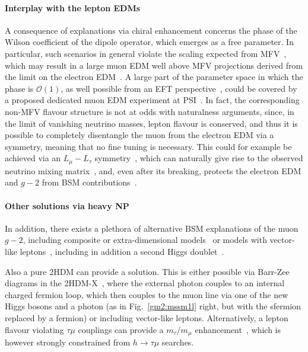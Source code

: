 \documentclass[10pt]{article}
\begin{document}
\paragraph{Interplay with the lepton EDMs}
%
A consequence of explanations via chiral enhancement concerns the phase of the Wilson coefficient of the dipole operator, which emerges as a free parameter. In particular, such scenarios in general violate
the scaling expected from MFV~\cite{Giudice:2012ms,Crivellin:2018qmi},
which may result in a large muon EDM well above MFV projections
derived from the limit on the electron EDM~\cite{Andreev:2018ayy}. A large part of the parameter space in which the phase is ${\mathcal O}(1)$, as well possible from an EFT
perspective~\cite{Pruna:2017tif,Crivellin:2018qmi,Crivellin:2019mvj}, could be covered by a proposed dedicated muon EDM experiment at
PSI~\cite{Adelmann:2021udj}.  In fact, the corresponding non-MFV flavour structure is not at odds with naturalness arguments, since, in the limit of vanishing neutrino masses, lepton flavour is conserved, and thus it is possible to completely disentangle the muon from the electron EDM via a symmetry, meaning that no fine tuning is
necessary. This could for example be achieved via an $L_\mu-L_\tau$ symmetry~\cite{He:1990pn,Foot:1990mn,He:1991qd}, which can naturally give rise to the observed neutrino mixing
matrix~\cite{Binetruy:1996cs,Bell:2000vh,Choubey:2004hn}, and, even after its breaking, protects the electron EDM and $g-2$ from BSM contributions~\cite{Altmannshofer:2016oaq}.

\paragraph{Other solutions via heavy NP}
%
In addition, there exists a plethora of alternative BSM explanations
of the muon $g-2$, including composite or extra-dimensional
models~\cite{Das:2001it,Xiong:2001rt,Park:2001uc} or models with vector-like leptons~\cite{Stockinger:1900zz,Giudice:2012ms,Dermisek:2013gta,Falkowski:2013jya,Altmannshofer:2016oaq,Kowalska:2017iqv,Crivellin:2018qmi,Arnan:2019uhr,Crivellin:2021rbq}, including in addition a second Higgs doublet~\cite{Ferreira:2021gke,Chun:2020uzw,Frank:2020smf}.

Also a pure 2HDM can provide a solution. This is either possible via Barr-Zee diagrams in the 2HDM-X~\cite{Cao:2009as,Broggio:2014mna,Wang:2014sda,Ilisie:2015tra,Abe:2015oca,Crivellin:2015hha,Chun:2015hsa,Chun:2016hzs,Cherchiglia:2017uwv,Wang:2018hnw,Chun:2019oix,Chun:2019sjo,Athron:2021iuf,Ferreira:2021gke}, where the external photon
couples to an internal charged fermion loop, which then couples to the muon line via one of the new Higgs bosons and a photon (as in Fig.~\ref{gm2:mssm1l} right, but with the sfermion replaced by a fermion) or including vector-like leptons. Alternatively, a lepton flavour violating $\tau\mu$ couplings can provide a $m_\tau/m_\mu$ enhancement~\cite{Crivellin:2019dun,Iguro:2020rby,Wang:2021fkn,Hou:2021qmf}, which is however strongly constrained from $h\to\tau\mu$ searches.
\end{document}
